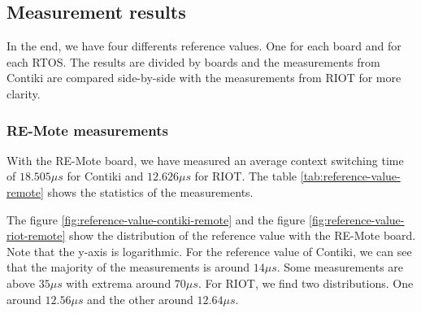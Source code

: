 \subsection{Measurement results\label{sec:ref-measurements}}

In the end, we have four differents reference values.
One for each board and for each RTOS.
The results are divided by boards and the measurements from Contiki are compared side-by-side with the measurements from RIOT for more clarity.

\subsubsection{RE-Mote measurements}
With the RE-Mote board, we have measured an average context switching time of $18.505\mu s$ for Contiki and $12.626 \mu s$ for RIOT.
The table \ref{tab:reference-value-remote} shows the statistics of the measurements.



The figure \ref{fig:reference-value-contiki-remote} and the figure \ref{fig:reference-value-riot-remote} show the distribution of the reference value with the RE-Mote board.
Note that the y-axis is logarithmic.
For the reference value of Contiki, we can see that the majority of the measurements is around $14 \mu s$.
Some measurements are above $35 \mu s$ with extrema around $70 \mu s$.
For RIOT, we find two distributions.
One around $12.56\mu s$ and the other around $12.64\mu s$.

